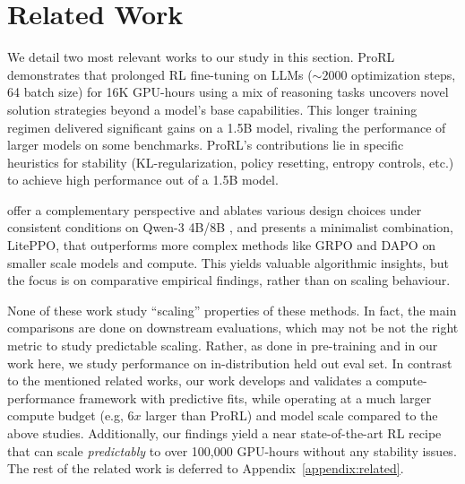 \section{Related Work}
\label{sec:related}

We detail two most relevant works to our study in this section. ProRL \citep{prorl} demonstrates that prolonged RL fine-tuning on LLMs ($\sim2000$ optimization steps, 64 batch size) for 16K GPU-hours using a mix of reasoning tasks uncovers novel solution strategies beyond a model's base capabilities. This longer training regimen delivered significant gains on a 1.5B model, rivaling the performance of larger models on some benchmarks. ProRL's contributions lie in specific heuristics for stability (KL-regularization, policy resetting, entropy controls, etc.) to achieve high performance out of a 1.5B model. 

\citet{tricks_traps} offer a complementary perspective and ablates various design choices under consistent conditions on Qwen-3 4B/8B \citep{qwen3technicalreport}, and presents a minimalist combination, LitePPO, that outperforms more complex methods like GRPO \citep{shao2024deepseekmath} and DAPO \citep{yu2025dapo} on smaller scale models and compute. This yields valuable algorithmic insights, but the focus is on comparative empirical findings, rather than on scaling behaviour. 

None of these work study ``scaling'' properties of these methods. In fact, the main comparisons are done on downstream evaluations, which may not be not the right metric to study predictable scaling. Rather, as done in pre-training and in our work here,  we study performance on in-distribution held out eval set. In contrast to the mentioned related works, our work develops and validates a compute-performance framework with predictive fits, while operating at a much larger compute budget (e.g, $6x$ larger than ProRL) and model scale compared to the above studies. 
Additionally, our findings yield a near state-of-the-art RL recipe that can scale \emph{predictably} to over 100,000 GPU-hours without any stability issues. The rest of the related work is deferred to Appendix~\ref{appendix:related}.

